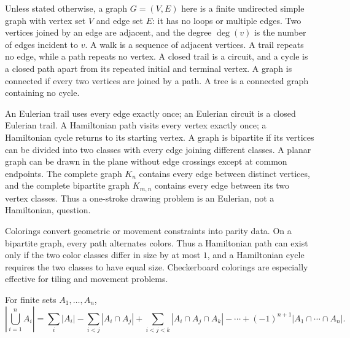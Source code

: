     \begin{definition}
        Unless stated otherwise, a graph $G=(V,E)$ here is a finite undirected
        simple graph with vertex set $V$ and edge set $E$: it has no loops or
        multiple edges. Two vertices joined by an
        edge are adjacent, and the degree $\deg(v)$ is the number of edges
        incident to $v$. A walk is a sequence of adjacent vertices. A trail
        repeats no edge, while a path repeats no vertex. A closed trail is a
        circuit, and a cycle is a closed path apart from its repeated initial
        and terminal vertex. A graph is connected if every two vertices are
        joined by a path. A tree is a connected graph containing no cycle.

        An Eulerian trail uses every edge exactly once; an Eulerian circuit is
        a closed Eulerian trail. A Hamiltonian path visits every vertex exactly
        once; a Hamiltonian cycle returns to its starting vertex. A graph is
        bipartite if its vertices can be divided into two classes with every
        edge joining different classes. A planar graph can be drawn in the
        plane without edge crossings except at common endpoints. The complete
        graph $K_n$ contains every edge between distinct vertices, and the
        complete bipartite graph $K_{m,n}$ contains every edge between its two
        vertex classes. Thus a one-stroke drawing problem is an Eulerian, not a
        Hamiltonian, question.
    \end{definition}

    \begin{strategy}
        Colorings convert geometric or movement constraints into parity data.
        On a bipartite graph, every path alternates colors. Thus a Hamiltonian
        path can exist only if the two color classes differ in size by at most
        $1$, and a Hamiltonian cycle requires the two classes to have equal size.
        Checkerboard colorings are especially effective for tiling and movement
        problems.
    \end{strategy}

    \begin{theorem}
        For finite sets $A_1,\dots,A_n$,
        \[
            \left|\bigcup_{i=1}^{n}A_i\right|
            =
            \sum_i |A_i|
            -
            \sum_{i<j}|A_i\cap A_j|
            +
            \sum_{i<j<k}|A_i\cap A_j\cap A_k|
            -\cdots
            +(-1)^{n+1}|A_1\cap\cdots\cap A_n|.
        \]
    \end{theorem}

